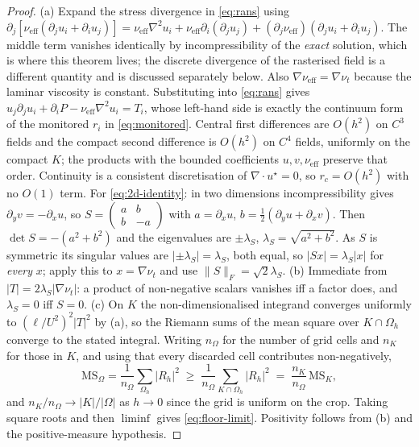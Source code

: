 \begin{proof}
(a) Expand the stress divergence in \eqref{eq:rans} using
$\partial_j[\nu_{\mathrm{eff}}(\partial_ju_i+\partial_iu_j)]
=\nu_{\mathrm{eff}}\nabla^2u_i+\nu_{\mathrm{eff}}\partial_i(\partial_ju_j)
+(\partial_j\nu_{\mathrm{eff}})(\partial_ju_i+\partial_iu_j)$.
The middle term vanishes identically by incompressibility of the \emph{exact} solution,
which is where this theorem lives; the discrete divergence of the rasterised field is a
different quantity and is discussed separately below. Also
$\nabla\nu_{\mathrm{eff}}=\nabla\nu_t$ because the laminar viscosity is constant. Substituting into \eqref{eq:rans} gives
$u_j\partial_ju_i+\partial_iP-\nu_{\mathrm{eff}}\nabla^2u_i=T_i$, whose left-hand side is
exactly the continuum form of the monitored $r_i$ in \eqref{eq:monitored}. Central first
differences are $O(h^2)$ on $C^3$ fields and the compact second difference is $O(h^2)$ on
$C^4$ fields, uniformly on the compact $K$; the products with the bounded coefficients
$u,v,\nu_{\mathrm{eff}}$ preserve that order. Continuity is a consistent discretisation of
$\nabla\!\cdot\!u^\star=0$, so $r_c=O(h^2)$ with no $O(1)$ term.
For \eqref{eq:2d-identity}: in two dimensions incompressibility gives $\partial_yv=-\partial_xu$,
so $S=\left(\begin{smallmatrix}a&b\\ b&-a\end{smallmatrix}\right)$ with $a=\partial_xu$,
$b=\tfrac12(\partial_yu+\partial_xv)$. Then $\det S=-(a^2+b^2)$ and the eigenvalues are
$\pm\lambda_S$, $\lambda_S=\sqrt{a^2+b^2}$. As $S$ is symmetric its singular values are
$|{\pm}\lambda_S|=\lambda_S$, both equal, so $|Sx|=\lambda_S|x|$ for \emph{every} $x$; apply
this to $x=\nabla\nu_t$ and use $\|S\|_F=\sqrt{2}\lambda_S$.
(b) Immediate from $|T|=2\lambda_S|\nabla\nu_t|$: a product of non-negative scalars vanishes
iff a factor does, and $\lambda_S=0$ iff $S=0$.
(c) On $K$ the non-dimensionalised integrand converges uniformly to
$(\ell/U^2)^2|T|^2$ by (a), so the Riemann sums of the mean square over $K\cap\Omega_h$
converge to the stated integral. Writing $n_\Omega$ for the number of grid cells and $n_K$
for those in $K$, and using that every discarded cell contributes non-negatively,
\[
\mathrm{MS}_\Omega=\frac{1}{n_\Omega}\sum_{\Omega_h}|R_h|^2
\;\ge\;\frac{1}{n_\Omega}\sum_{K\cap\Omega_h}|R_h|^2
\;=\;\frac{n_K}{n_\Omega}\,\mathrm{MS}_K ,
\]
and $n_K/n_\Omega\to|K|/|\Omega|$ as $h\to0$ since the grid is uniform on the crop. Taking
square roots and then $\liminf$ gives \eqref{eq:floor-limit}. Positivity follows from (b)
and the positive-measure hypothesis.
\end{proof}

